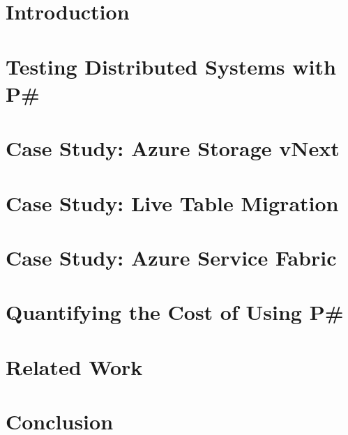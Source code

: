 \documentclass[letterpaper,twocolumn,10pt]{article}
\newcommand{\psharp}{P\#\xspace}
\begin{document}
\section{Introduction}
\label{sec:intro}



%
%

\section{Testing Distributed Systems with \psharp}
\label{sec:overview}



\section{Case Study: Azure Storage vNext}
\label{sec:vnext}



\section{Case Study: Live Table Migration}
\label{sec:migrating}



\section{Case Study: Azure Service Fabric}
\label{sec:fabric}



\section{Quantifying the Cost of Using \psharp}
\label{sec:eval}



\section{Related Work}
\label{sec:rw}



\section{Conclusion}
\label{sec:conclusion}
\end{document}
